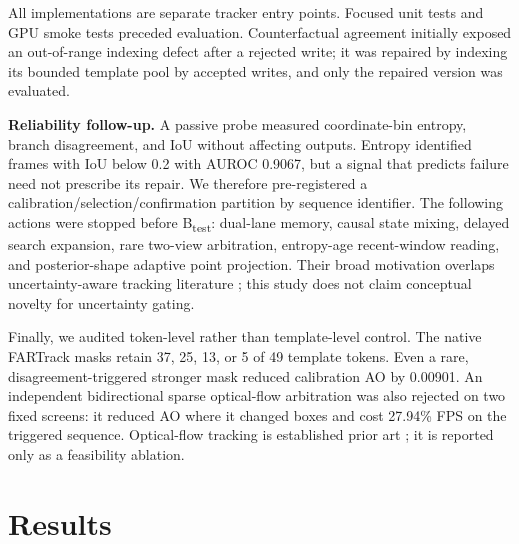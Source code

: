 \documentclass{article}
\begin{document}
All implementations are separate tracker entry points. Focused unit tests and
GPU smoke tests preceded evaluation. Counterfactual agreement initially exposed
an out-of-range indexing defect after a rejected write; it was repaired by
indexing its bounded template pool by accepted writes, and only the repaired
version was evaluated.

\noindent\textbf{Reliability follow-up.} A passive probe measured coordinate-bin
entropy, branch disagreement, and IoU without affecting outputs. Entropy
identified frames with IoU below 0.2 with AUROC 0.9067, but a signal that
predicts failure need not prescribe its repair. We therefore pre-registered a
calibration/selection/confirmation partition by sequence identifier. The
following actions were stopped before B\textsubscript{test}: dual-lane memory,
causal state mixing, delayed search expansion, rare two-view arbitration,
entropy-age recent-window reading, and posterior-shape adaptive point
projection. Their broad motivation overlaps uncertainty-aware tracking
literature \cite{zhou2021uncertainty,zhang2022uast,yao2025unctrack}; this study
does not claim conceptual novelty for uncertainty gating.

Finally, we audited token-level rather than template-level control. The native
FARTrack masks retain 37, 25, 13, or 5 of 49 template tokens. Even a rare,
disagreement-triggered stronger mask reduced calibration AO by 0.00901. An
independent bidirectional sparse optical-flow arbitration was also rejected on
two fixed screens: it reduced AO where it changed boxes and cost 27.94\% FPS on
the triggered sequence. Optical-flow tracking is established prior art
\cite{lucas1981iterative}; it is reported only as a feasibility ablation.

\section{Results}
\begin{table}[h]
\centering
\caption{Complete B\textsubscript{dev} results. AO is mean frame IoU.}
\end{table}
\end{document}
